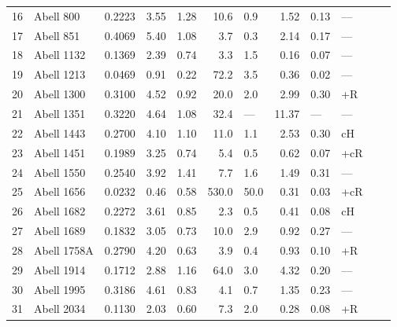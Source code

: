 \begin{ThreePartTable}
\begin{longtable}{clcccr@{$\,\pm\,$}lr@{$\,\pm\,$}llll}
16 & Abell 800             & 0.2223 & 3.55 & 1.28 &  10.6 &  0.9          &  1.52 &  0.13 & --- & \parencite{govoni2012}  \\
17 & Abell 851             & 0.4069 & 5.40 & 1.08 &   3.7 &  0.3          &  2.14 &  0.17 & --- & \parencite{giovannini2009}  \\
18 & Abell 1132            & 0.1369 & 2.39 & 0.74 &   3.3 &  1.5          &  0.16 &  0.07 & --- & \parencite{wilber2018}  \\
19 & Abell 1213            & 0.0469 & 0.91 & 0.22 &  72.2 &  3.5          &  0.36 &  0.02 & --- & \parencite{giovannini2009}  \\
20 & Abell 1300            & 0.3100 & 4.52 & 0.92 &  20.0 &  2.0          &  2.99 &  0.30 & +R  & \parencite{reid1999}  \\
21 & Abell 1351            & 0.3220 & 4.64 & 1.08 &  32.4 &  ---          & 11.37 &  ---  & --- & \parencite{giacintucci2011b}  \\
22 & Abell 1443            & 0.2700 & 4.10 & 1.10 &  11.0 &  1.1\tnote{b} &  2.53 &  0.30 & cH  & \parencite{bonafede2015}  \\
23 & Abell 1451            & 0.1989 & 3.25 & 0.74 &   5.4 &  0.5          &  0.62 &  0.07 & +cR & \parencite{cuciti2018}  \\
24 & Abell 1550            & 0.2540 & 3.92 & 1.41 &   7.7 &  1.6          &  1.49 &  0.31 & --- & \parencite{govoni2012}  \\
25 & Abell 1656            & 0.0232 & 0.46 & 0.58 & 530.0 & 50.0          &  0.31 &  0.03 & +cR & \parencite{kim1990}  \\
26 & Abell 1682            & 0.2272 & 3.61 & 0.85 &   2.3 &  0.5\tnote{c} &  0.41 &  0.08 & cH  & \parencite{macario2013}  \\
27 & Abell 1689            & 0.1832 & 3.05 & 0.73 &  10.0 &  2.9          &  0.92 &  0.27 & --- & \parencite{vacca2011}  \\
28 & Abell 1758A           & 0.2790 & 4.20 & 0.63 &   3.9 &  0.4          &  0.93 &  0.10 & +R  & \parencite{giovannini2009}  \\
29 & Abell 1914            & 0.1712 & 2.88 & 1.16 &  64.0 &  3.0          &  4.32 &  0.20 & --- & \parencite{bacchi2003}  \\
30 & Abell 1995            & 0.3186 & 4.61 & 0.83 &   4.1 &  0.7          &  1.35 &  0.23 & --- & \parencite{giovannini2009}  \\
31 & Abell 2034            & 0.1130 & 2.03 & 0.60 &   7.3 &  2.0          &  0.28 &  0.08 & +R  & \parencite{vanWeeren2011}  \\

\end{longtable}
\end{ThreePartTable}
